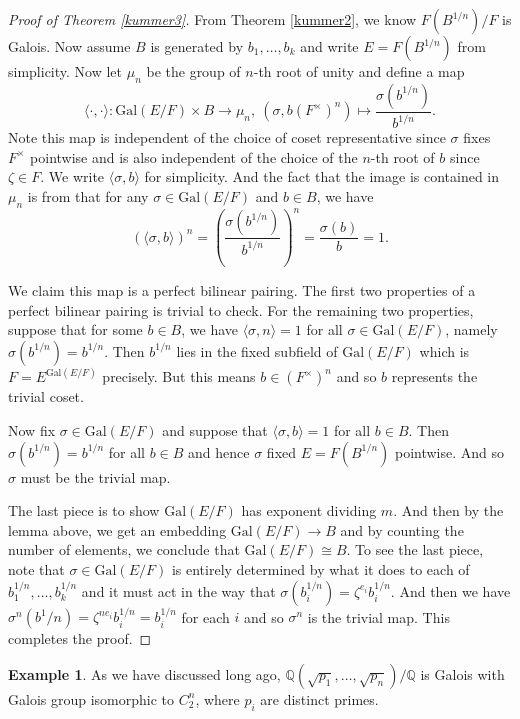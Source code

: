 \documentclass[12pt]{report}
\theoremstyle{definition}
\newtheorem{example}[theorem]{Example}
\newcommand{\gal}{\text{Gal}}
\newcommand{\ta}[1]{\langle #1 \rangle}
\newcommand{\qq}{\mathbb{Q}}
\begin{document}
\begin{proof}[Proof of Theorem \ref{kummer3}]
	From Theorem \ref{kummer2}, we know $F(B^{1/n})/F$ is Galois. Now assume $B$ is generated by $b_1,\dots,b_k$ and write $E=F(B^{1/n})$ from simplicity. Now let $\mu_n$ be the group of $n$-th root of unity and define a map
	$$\ta{\cdot,\cdot}: \gal(E/F)\times B\to\mu_n,~ (\sigma, b(F^\times)^n) \mapsto \frac{\sigma(b^{1/n})}{b^{1/n}}.$$
	Note this map is independent of the choice of coset representative since $\sigma$ fixes $F^\times$ pointwise and is also independent of the choice of the $n$-th root of $b$ since $\zeta\in F$. We write $\ta{\sigma,b}$ for simplicity. And the fact that the image is contained in $\mu_n$ is from that for any $\sigma\in \gal(E/F)$ and $b\in B$, we have
	$$(\ta{\sigma,b})^n =(\frac{\sigma(b^{1/n})}{b^{1/n}})^n=\frac{\sigma(b)}{b}=1.$$


	We claim this map is a perfect bilinear pairing. The first two properties of a perfect bilinear pairing is trivial to check. For the remaining two properties, suppose that for some $b\in B$, we have $\ta{\sigma,n}=1$ for all $\sigma\in \gal(E/F)$, namely $\sigma(b^{1/n})=b^{1/n}$. Then $b^{1/n}$ lies in the fixed subfield of $\gal(E/F)$ which is $F=E^{\gal(E/F)}$ precisely. But this means $b\in (F^\times)^n$ and so $b$ represents the trivial coset.


	Now fix $\sigma\in\gal(E/F)$ and suppose that $\ta{\sigma,b}=1$ for all $b\in B$. Then $\sigma(b^{1/n})=b^{1/n}$ for all $b\in B$ and hence $\sigma$ fixed $E=F(B^{1/n})$ pointwise. And so $\sigma$ must be the trivial map.


	The last piece is to show $\gal(E/F)$ has exponent dividing $m$. And then by the lemma above, we get an embedding $\gal(E/F)\to B$ and by counting the number of elements, we conclude that $\gal(E/F)\cong B$. To see the last piece, note that $\sigma\in\gal(E/F)$ is entirely determined by what it does to each of $b_1^{1/n},\dots,b_k^{1/n}$ and it must act in the way that $\sigma(b_i^{1/n})=\zeta^{e_i}b_i^{1/n}$. And then we have $\sigma^n(b^1/n)=\zeta^{ne_i}b_i^{1/n}=b_i^{1/n}$ for each $i$ and so $\sigma^n$ is the trivial map. This completes the proof.

\end{proof}

\begin{example}
	As we have discussed long ago, $\qq(\sqrt{p_1},\dots,\sqrt{p_n})/\qq$ is Galois with Galois group isomorphic to $C_2^n$, where $p_i$ are distinct primes.
\end{example}
\end{document}
